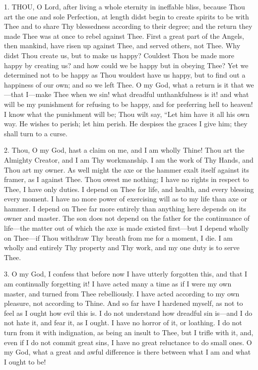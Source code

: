 

1. THOU,
O Lord, after living a whole eternity in ineffable bliss, because Thou
art the one and sole Perfection, at length didst begin to create spirits
to be with Thee and to share Thy blessedness according to their degree;
and the return they made Thee was at once to rebel against Thee. First a
great part of the Angels, then mankind, have risen up against Thee, and
served others, not Thee. Why didst Thou create us, but to make us happy?
Couldest Thou be made more happy by creating us? and how could we be
happy but in obeying Thee? Yet we determined not to be happy as Thou
wouldest have us happy, but to find out a happiness of our own; and so
we left Thee. O my God, what a return is it that we—that I—make Thee
when we sin! what dreadful unthankfulness is it! and what will be my
punishment for refusing to be happy, and for preferring hell to heaven!
I know what the punishment will be; Thou wilt say, ``Let him have it all
his own way. He wishes to perish; let him perish. He despises the
graces I give him; they shall turn to a curse.

2. Thou, O my God, hast a claim
on me, and I am wholly Thine! Thou art the Almighty Creator, and I am
Thy workmanship. I am the work of Thy Hands, and Thou art my owner. As
well might the axe or the hammer exalt itself against its framer, as I
against Thee. Thou owest me nothing; I have no rights in respect to
Thee, I have only duties. I depend on Thee for life, and health, and
every blessing every moment. I have no more power of exercising will as
to my life than axe or hammer. I depend on Thee far more entirely than
anything here depends on its owner and master. The son does not depend
on the father for the continuance of life—the matter out of which the
axe is made existed first—but I depend wholly on Thee—if Thou
withdraw Thy breath from me for a moment, I die. I am wholly and
entirely Thy property and Thy work, and my one duty is to serve Thee.

3. O my God, I confess that
before now I have utterly forgotten this, and that I am continually
forgetting it! I have acted many a time as if I were my own master, and
turned from Thee rebelliously. I have acted according to my own
pleasure, not according to Thine. And so far have I hardened myself, as
not to feel as I ought how evil this is. I do not understand how
dreadful sin is—and I do not hate it, and fear it, as I ought. I have
no horror of it, or loathing. I do not turn from it with indignation, as
being an insult to Thee, but I trifle with it, and, even if I do
not commit great sins, I have no great reluctance to do small ones. O my
God, what a great and awful difference is there between what I am and
what I ought to be!

